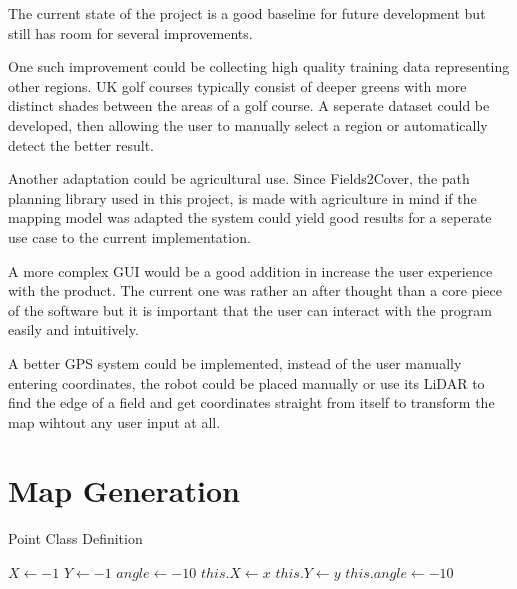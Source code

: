 \documentclass[final]{cmpreport_02}
\begin{document}
The current state of the project is a good baseline for future development but still has room for several improvements.

One such improvement could be collecting high quality training data representing other regions. UK golf courses typically consist of deeper greens with more distinct shades between the areas of a golf course. A seperate dataset could be developed, then allowing the user to manually select a region or automatically detect the better result.

Another adaptation could be agricultural use. 
Since Fields2Cover, the path planning library used in this project, is made with agriculture in mind if the mapping model was adapted the system could yield good results for a seperate use case to the current implementation.

A more complex GUI would be a good addition in increase the user experience with the product. The current one was rather an after thought than a core piece of the software but it is important that the user can interact with the program easily and intuitively.

A better GPS system could be implemented, instead of the user manually entering coordinates, the robot could be placed manually or use its LiDAR to find the edge of a field and get coordinates straight from itself to transform the map wihtout any user input at all.



\clearpage



\appendix
\clearpage

\section{Map Generation}

\begin{algorithm}[h!]
	\caption{Point Class Definition}
	\label{mg:point class}
	\begin{algorithmic}[1]
		\State $X \gets -1$ 
		\State $Y \gets -1$ 
		\State $angle \gets -10$ 
		\State $this.X \gets x$
		\State $this.Y \gets y$
		\State $this.angle \gets -10$ 
		\EndProcedure
		\EndProcedure
	\end{algorithmic}
\end{algorithm}
\end{document}
